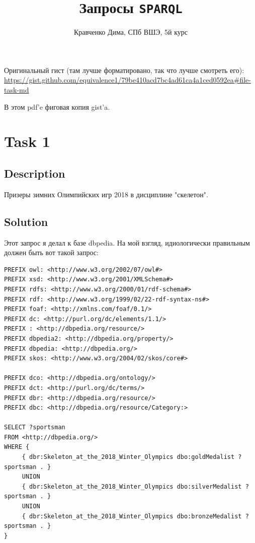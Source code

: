 \documentclass{article}
\begin{document}
\title{Запросы \texttt{SPARQL}}
\author{Кравченко Дима, СПб ВШЭ, 5й курс}

\maketitle

Оригинальный гист (там лучше форматировано, так что лучше смотреть его):
\url{https://gist.github.com/equivalence1/79be410acd7bc4ad61ca4a1ced0592ea#file-task-md}

В этом pdf'e фиговая копия gist'a.

\section*{Task 1}

\subsection*{Description}
Призеры зимних Олимпийских игр 2018 в дисциплине "скелетон".
\subsection*{Solution}

Этот запрос я делал к базе dbpedia. На мой взгляд, идиологически правильным должен быть вот такой запрос:

\begin{verbatim}
PREFIX owl: <http://www.w3.org/2002/07/owl#>
PREFIX xsd: <http://www.w3.org/2001/XMLSchema#>
PREFIX rdfs: <http://www.w3.org/2000/01/rdf-schema#>
PREFIX rdf: <http://www.w3.org/1999/02/22-rdf-syntax-ns#>
PREFIX foaf: <http://xmlns.com/foaf/0.1/>
PREFIX dc: <http://purl.org/dc/elements/1.1/>
PREFIX : <http://dbpedia.org/resource/>
PREFIX dbpedia2: <http://dbpedia.org/property/>
PREFIX dbpedia: <http://dbpedia.org/>
PREFIX skos: <http://www.w3.org/2004/02/skos/core#>

PREFIX dco: <http://dbpedia.org/ontology/>
PREFIX dct: <http://purl.org/dc/terms/>
PREFIX dbr: <http://dbpedia.org/resource/>
PREFIX dbc: <http://dbpedia.org/resource/Category:>

SELECT ?sportsman
FROM <http://dbpedia.org/>
WHERE {
     { dbr:Skeleton_at_the_2018_Winter_Olympics dbo:goldMedalist ?sportsman . }
     UNION
     { dbr:Skeleton_at_the_2018_Winter_Olympics dbo:silverMedalist ?sportsman . }
     UNION
     { dbr:Skeleton_at_the_2018_Winter_Olympics dbo:bronzeMedalist ?sportsman . }
}
\end{verbatim}
\end{document}
